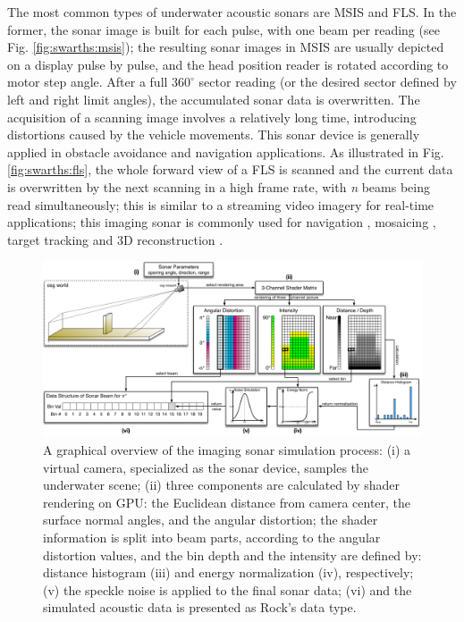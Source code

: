 \documentclass[final,5p,times]{elsarticle}
\begin{document}
The most common types of underwater acoustic sonars are MSIS and FLS. In
the former, the sonar image is built for each pulse, with one beam per
reading (see Fig. \ref{fig:swarths:msis}); the resulting sonar images in MSIS are usually depicted on a display pulse by pulse, and the head position reader is rotated according to motor step angle. After a full $360^{\circ}$ sector reading (or the desired sector defined by left and right limit angles), the accumulated sonar data is overwritten. The acquisition of a scanning image involves a relatively long time, introducing distortions caused by the vehicle movements. This sonar device is generally applied in obstacle avoidance \cite{ganesan2015} and navigation \cite{ribas2010} applications. As illustrated in Fig. \ref{fig:swarths:fls}, the whole forward view of a FLS is scanned and the current data is overwritten by the next scanning in a high frame rate, with \textit{n} beams being read simultaneously; this is similar to a streaming video imagery for real-time applications; this imaging sonar is commonly used for navigation \cite{fallon2013}, mosaicing \cite{hurtos2014}, target tracking \cite{liu2016} and 3D reconstruction \cite{huang2015a}.


\begin{figure}[t]
    \includegraphics[width=0.85\paperwidth]{figs/sonar_sim}
    \centering
    \captionsetup{justification=justified}
    \caption{A graphical overview of the imaging sonar simulation process:    (i) a virtual camera, specialized as the sonar device, samples the underwater scene; (ii) three components are calculated by shader rendering on GPU: the Euclidean distance from camera center, the surface normal angles, and the angular distortion; the shader information is split into beam parts, according to the angular distortion values, and the bin depth and the intensity are defined by: distance histogram (iii) and energy normalization (iv), respectively; (v) the speckle noise is applied to the final sonar data; (vi) and the simulated acoustic data is presented as Rock's data type.}
    \label{fig:sonar_sim}
\end{figure}
\end{document}
